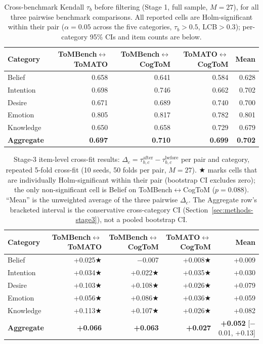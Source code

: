 \documentclass{article} %
\begin{document}
\begin{table}[h]
\centering
\small
\caption{Cross-benchmark Kendall $\tau_b$ before filtering (Stage 1, full sample, $M{=}27$), for all three pairwise benchmark comparisons. All reported cells are Holm-significant within their pair ($\alpha=0.05$ across the five categories, $\tau_b>0.5$, LCB$>0.3$); per-category 95\% CIs and item counts are below.}
\label{tab:tau_b1}
\begin{tabular}{lrrrr}
\toprule
Category & ToMBench$\leftrightarrow$ToMATO & ToMBench$\leftrightarrow$CogToM & ToMATO$\leftrightarrow$CogToM & Mean \\
\midrule
Belief    & 0.658 & 0.641 & 0.584 & 0.628 \\
Intention & 0.698 & 0.746 & 0.662 & 0.702 \\
Desire    & 0.671 & 0.689 & 0.740 & 0.700 \\
Emotion   & 0.805 & 0.817 & 0.782 & 0.801 \\
Knowledge & 0.650 & 0.658 & 0.729 & 0.679 \\
\midrule
\textbf{Aggregate} & \textbf{0.697} & \textbf{0.710} & \textbf{0.699} & \textbf{0.702} \\
\bottomrule
\end{tabular}
\end{table}
 
\begin{table}[h]
\centering
\footnotesize
\caption{Stage-3 item-level cross-fit results: $\Delta_c=\tau_{b,c}^{\text{after}}-\tau_{b,c}^{\text{before}}$ per pair and category, repeated 5-fold cross-fit (10 seeds, 50 folds per pair, $M{=}27$). ★ marks cells that are individually Holm-significant within their pair (bootstrap CI excludes zero); the only non-significant cell is Belief on ToMBench$\leftrightarrow$CogToM ($p=0.088$). ``Mean'' is the unweighted average of the three pairwise $\Delta_c$. The Aggregate row's bracketed interval is the conservative cross-category CI (Section~\ref{sec:methods-stage3}), not a pooled bootstrap CI.}
\label{tab:tau_b3}
\begin{tabular}{lrrrr}
\toprule
Category & ToMBench$\leftrightarrow$ToMATO & ToMBench$\leftrightarrow$CogToM & ToMATO$\leftrightarrow$CogToM & Mean \\
\midrule
Belief    & +0.025★ & $-$0.007  & +0.008★ & +0.009 \\
Intention & +0.034★ & +0.022★ & +0.035★ & +0.030 \\
Desire    & +0.103★ & +0.108★ & +0.026★ & +0.079 \\
Emotion   & +0.056★ & +0.086★ & +0.036★ & +0.059 \\
Knowledge & +0.113★ & +0.107★ & +0.026★ & +0.082 \\
\midrule
\textbf{Aggregate} & \textbf{+0.066} & \textbf{+0.063} & \textbf{+0.027} & \textbf{+0.052} [$-$0.01, +0.13] \\
\bottomrule
\end{tabular}
\end{table}
 
\end{document}

